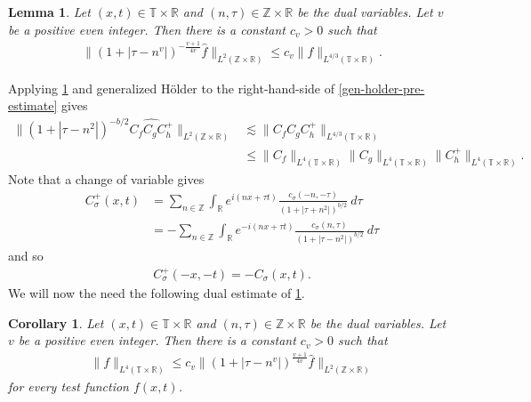\documentclass[12pt,reqno]{amsart}
\numberwithin{equation}{section}  %
\numberwithin{figure}{section}
\newcommand{\rr}{\mathbb{R}}
\newcommand{\zz}{\mathbb{Z}}
\newcommand{\ci}{\mathbb{T}}
\newcommand{\wh}{\widehat}
\theoremstyle{plain}
\newtheorem{lemma}{Lemma}
\newtheorem{corollary}{Corollary}
\theoremstyle{definition}
\theoremstyle{remark}
\begin{document}
%
%
%
%
%
%
%
%
\begin{lemma}
  \label{lem:four-mult-est-L4}
  Let $(x, t) \in \ci \times \rr $ and $(n, \tau) \in \zz \times \rr$ be 
  the dual variables. Let $v$ be a positive even integer. Then there is a 
  constant $c_v > 0$ such that
%
%
\begin{equation}
  \label{four-mult-est-L4*}
  \begin{split}
    \| \left( 1 + | \tau - n^v | 
    \right)^{-\frac{v+1}{4v}}
    \wh{f}\|_{L^2(\zz \times \rr)} \le c_v \|f \|_{L^{4/3}( \ci \times \rr)}.
  \end{split}
\end{equation}
%
%
\end{lemma}
%
%
Applying \cref{cor:four-mult-est-L4} and generalized H\"{o}lder to the 
right-hand-side of \eqref{gen-holder-pre-estimate} gives
%
%
\begin{equation}
  \label{gen-holder-piece-1}
  \begin{split}
    \|\left( 1 + | \tau - n^{2} | \right)^{-b/2} \wh{C_f C_{ 
    g } C^+_{h}}\|_{L^2(\zz \times \rr)}
    & \lesssim  \|C_f C_{g} C^+_{h} \|_{L^{4/3}(\ci \times \rr)}
    \\
    & \le \|C_f \|_{L^4(\ci \times \rr)} \|C_{g}\|_{L^4(\ci \times \rr)} 
    \|C^+_{h}\|_{L^4(\ci \times \rr)}.
  \end{split}
\end{equation}
%
%
Note that a change of variable gives
%
%
\begin{equation*}
  \begin{split}
    C_\sigma^+(x, t)
    & = \sum_{n \in \zz} \int_\rr e^{i(nx +  \tau t)} \frac{c_\sigma\left( -n, -\tau \right)}{\left( 
    1 + | \tau + n^{2} | \right)^{b/2}} \ d \tau
    \\
    & = - \sum_{n \in \zz} \int_\rr e^{-i(nx +   \tau t )}
    \frac{c_\sigma\left( n, \tau \right)}{\left( 
    1 + | \tau - n^{2} | \right)^{b/2}} \ d \tau
  \end{split}
\end{equation*}
%
%
and so
%
%
\begin{equation*}
  \begin{split}
    C_\sigma^+(-x, -t) = -C_\sigma(x, t).
  \end{split}
\end{equation*}
%
%
We will now the need the following dual estimate of
\cref{lem:four-mult-est-L4}.
%
\begin{corollary}
  \label{cor:four-mult-est-L4}
  Let $(x, t) \in \ci \times \rr $ and $(n, \tau) \in \zz \times \rr$ be 
  the dual variables. Let $v$ be a positive even integer. Then there is a 
  constant $c_v > 0$ such that
%
%
\begin{equation}
  \label{four-mult-est-L4}
  \begin{split}
    \|f\|_{L^4(\ci \times \rr)} \le c_v \|\left( 1 + | \tau - n^v | 
    \right)^\frac{v+1}{4v} \wh{f} \|_{L^2( \zz \times \rr)}
  \end{split}
\end{equation}
for every test function $f(x, t)$. 
%
%
%
%
\end{corollary}
\end{document}
